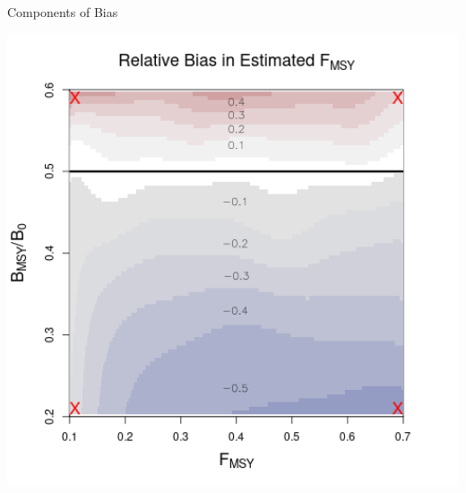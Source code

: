\documentclass[ xcolor = pdftex, dvipsnames, table ]{beamer}
\begin{document}
\begin{frame}{Components of Bias}
\begin{minipage}[h!]{0.49\textwidth}
\end{minipage}
\end{frame}

%
\begin{frame}%
\begin{minipage}[h!]{0.325\textwidth}
\hspace*{-1cm}
\includegraphics[width=1.25\textwidth]{../../.././nick/gpBias/fMSYXRelBiasPellaFlatNoQ.png}
\end{minipage}
\begin{minipage}[h!]{0.325\textwidth}

\end{minipage}
\end{frame}
\end{document}
